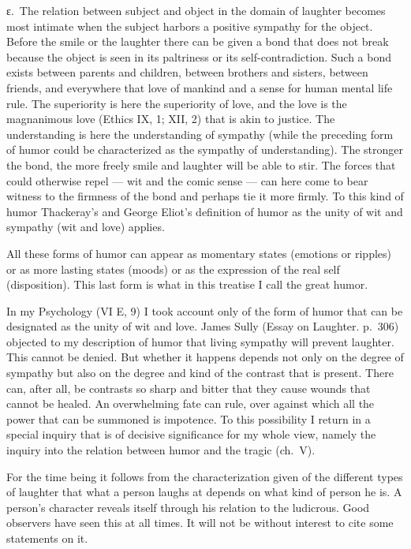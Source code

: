 \documentclass[12pt]{book}
\newcommand{\opage}[1]{\marginnote{\footnotesize\textit{[#1]}}}
\begin{document}
ε.~The relation between subject and object in the domain of laughter becomes most
intimate when the subject harbors a positive sympathy for the object. Before the
smile or the laughter there can be given a bond that does not break because the
object is seen in its paltriness or its self-contradiction. Such a bond exists
between parents and children, between brothers and sisters, between friends, and
everywhere that love of mankind and a sense for human mental life rule. The
superiority is here the superiority of love, and the love is the magnanimous love
(Ethics IX, 1; XII, 2) that is akin to justice. The understanding is here the
understanding of sympathy (while the preceding form of humor could be
characterized as the sympathy of understanding). The stronger the bond, the more
freely smile and laughter will be able to stir. The forces that could otherwise
repel --- wit and the comic sense --- can here come to bear witness to the
firmness of the bond and perhaps tie it more firmly. To this kind of humor
Thackeray's and George Eliot's definition of humor as the unity of wit and sympathy
(wit and love) applies.

All these forms of humor can appear as momentary states (emotions or ripples) or as
more lasting states (moods) or as the expression of the real self (disposition).
This last form is what in this treatise I call the great humor.

In my Psychology (VI E, 9) I took account only of the form of humor that can be
designated as the unity of wit and love. James Sully (Essay on Laughter. p.~306)
objected to my description of humor that living sympathy will prevent laughter.
This \opage{55}cannot be denied. But whether it happens depends not only on the
degree of sympathy but also on the degree and kind of the contrast that is present.
There can, after all, be contrasts so sharp and bitter that they cause wounds that
cannot be healed. An overwhelming fate can rule, over against which all the power
that can be summoned is impotence. To this possibility I return in a special
inquiry that is of decisive significance for my whole view, namely the inquiry into
the relation between humor and the tragic (ch.~V).

For the time being it follows from the characterization given of the different
types of laughter that what a person laughs at depends on what kind of person he
is. A person's character reveals itself through his relation to the ludicrous.
Good observers have seen this at all times. It will not be without interest to
cite some statements on it.
\end{document}
